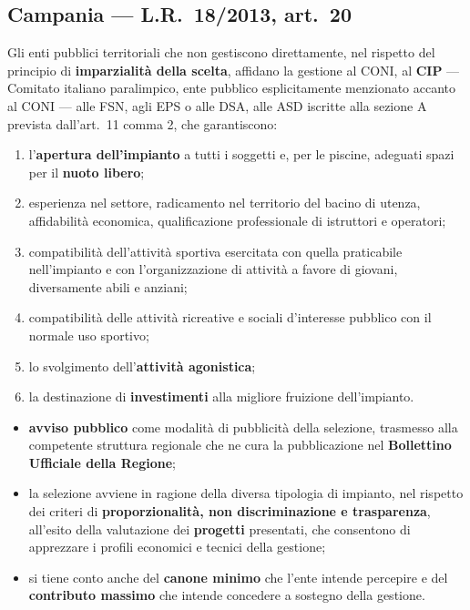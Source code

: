 \subsection{Campania --- L.R.\ 18/2013, art.\ 20}

Gli enti pubblici territoriali che non gestiscono direttamente, nel rispetto del principio di
\textbf{imparzialità della scelta}, affidano la gestione al CONI, al \textbf{CIP} --- Comitato
italiano paralimpico, ente pubblico esplicitamente menzionato accanto al CONI --- alle FSN, agli
EPS o alle DSA, alle ASD iscritte alla sezione A prevista dall'art.\ 11 comma 2, che garantiscono:

\begin{enumerate}
  \item[a)] l'\textbf{apertura dell'impianto} a tutti i soggetti e, per le piscine, adeguati spazi
    per il \textbf{nuoto libero};
  \item[b)] esperienza nel settore, radicamento nel territorio del bacino di utenza, affidabilità
    economica, qualificazione professionale di istruttori e operatori;
  \item[c)] compatibilità dell'attività sportiva esercitata con quella praticabile nell'impianto e
    con l'organizzazione di attività a favore di giovani, diversamente abili e anziani;
  \item[d)] compatibilità delle attività ricreative e sociali d'interesse pubblico con il normale
    uso sportivo;
  \item[e)] lo svolgimento dell'\textbf{attività agonistica};
  \item[f)] la destinazione di \textbf{investimenti} alla migliore fruizione dell'impianto.
\end{enumerate}


\begin{itemize}
  \item \textbf{avviso pubblico} come modalità di pubblicità della selezione, trasmesso alla
    competente struttura regionale che ne cura la pubblicazione nel \textbf{Bollettino Ufficiale
    della Regione};
  \item la selezione avviene in ragione della diversa tipologia di impianto, nel rispetto dei
    criteri di \textbf{proporzionalità, non discriminazione e trasparenza}, all'esito della
    valutazione dei \textbf{progetti} presentati, che consentono di apprezzare i profili economici
    e tecnici della gestione;
  \item si tiene conto anche del \textbf{canone minimo} che l'ente intende percepire e del
    \textbf{contributo massimo} che intende concedere a sostegno della gestione.
\end{itemize}

